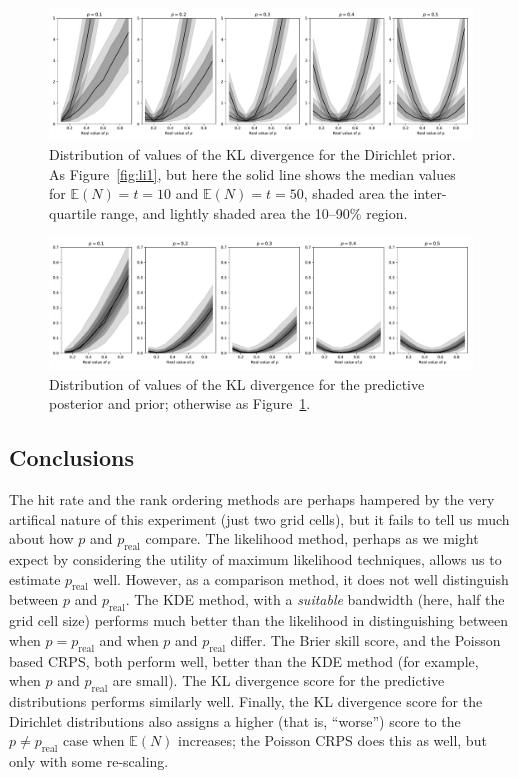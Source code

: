 \documentclass[twoside,a4paper,twocolumn,10pt]{article}
\theoremstyle{plain}
\theoremstyle{definition}
\begin{document}
\begin{figure}
  \includegraphics[width=\textwidth]{../details/info_dir_toy.pdf}
  \caption{Distribution of values of the KL divergence for the Dirichlet prior.
   As Figure~\ref{fig:li1}, but here the solid line shows the median values for
   $\mathbb E(N)=t=10$ and $\mathbb E(N)=t=50$, shaded area the inter-quartile
   range, and lightly shaded area the 10--90\% region.}
  \label{fig:info1}
\end{figure}

\begin{figure}
  \includegraphics[width=\textwidth]{../details/info_dirp_toy.pdf}
  \caption{Distribution of values of the KL divergence for the predictive posterior and
  prior; otherwise as Figure~\ref{fig:info1}.}
  \label{fig:info2}
\end{figure}



\subsection{Conclusions}

The hit rate and the rank ordering methods are perhaps hampered by the very artifical nature
of this experiment (just two grid cells), but it fails to tell us much about how
$p$ and $p_{\text{real}}$ compare.  The likelihood method, perhaps as we might expect
by considering the utility of maximum likelihood techniques, allows us to estimate
$p_{\text{real}}$ well.  However, as a comparison method, it does not well distinguish between
$p$ and $p_{\text{real}}$.  The KDE method, with a \emph{suitable} bandwidth (here, half
the grid cell size) performs much better than the likelihood in distinguishing between
when $p=p_{\text{real}}$ and when $p$ and $p_{\text{real}}$ differ.  The Brier skill score,
and the Poisson based CRPS, both perform well, better than the KDE method (for example,
when $p$ and $p_{\text{real}}$ are small).  The KL divergence score for the predictive
distributions performs similarly well.  Finally, the KL divergence score for the Dirichlet
distributions also assigns a higher (that is, ``worse'') score to the $p \not= p_{\text{real}}$
case when $\mathbb E(N)$ increases; the Poisson CRPS does this as well, but only with some
re-scaling.
\end{document}
